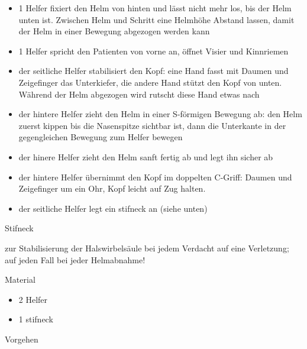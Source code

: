 \documentclass{article}
\begin{document}
\begin{itemize}
\item 1 Helfer fixiert den Helm von hinten und l\"asst nicht mehr los,
bis der Helm unten ist. Zwischen Helm und Schritt eine Helmh\"ohe
Abstand lassen, damit der Helm in einer Bewegung abgezogen werden kann

\item 1 Helfer spricht den Patienten von vorne an, \"offnet Visier und
Kinnriemen

\item der seitliche Helfer stabilisiert den Kopf: eine Hand fasst mit
Daumen und Zeigefinger das Unterkiefer, die andere Hand st\"utzt den
Kopf von unten. W\"ahrend der Helm abgezogen wird rutscht diese Hand
etwas nach

\item der hintere Helfer zieht den Helm in einer S-f\"ormigen Bewegung
ab: den Helm zuerst kippen bis die Nasenspitze sichtbar ist, dann die
Unterkante in der gegengleichen Bewegung zum Helfer bewegen

\item der hinere Helfer zieht den Helm sanft fertig ab und legt ihn
sicher ab

\item der hintere Helfer \"ubernimmt den Kopf im doppelten C-Griff:
Daumen und Zeigefinger um ein Ohr, Kopf leicht auf Zug halten.

\item der seitliche Helfer legt ein stifneck an (siehe unten)

\end{itemize}
Stifneck

zur Stabilisierung der Halswirbels\"aule bei jedem Verdacht auf eine
Verletzung; auf jeden Fall bei jeder Helmabnahme!

Material

\begin{itemize}
\item 2 Helfer

\item 1 stifneck

\end{itemize}
Vorgehen
\end{document}

